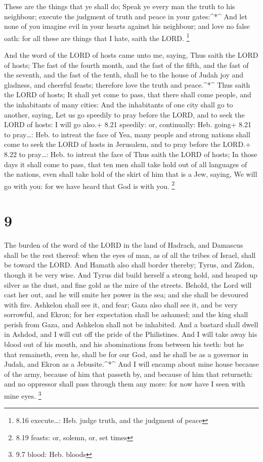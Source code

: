  These are the things that ye shall do; Speak ye every man
the truth to his neighbour; execute the judgment of truth and peace in
your gates:\^{}*\^{}  And let none of you imagine evil in
your hearts against his neighbour; and love no false oath: for all these
are things that I hate, saith the LORD. \footnote{8.16 execute\ldots:
  Heb. judge truth, and the judgment of peace}

 And the word of the LORD of hosts came unto me, saying,
 Thus saith the LORD of hosts; The fast of the fourth
month, and the fast of the fifth, and the fast of the seventh, and the
fast of the tenth, shall be to the house of Judah joy and gladness, and
cheerful feasts; therefore love the truth and peace.\^{}*\^{}
 Thus saith the LORD of hosts; It shall yet come to pass,
that there shall come people, and the inhabitants of many cities:
 And the inhabitants of one city shall go to another,
saying, Let us go speedily to pray before the LORD, and to seek the LORD
of hosts: I will go also.+ 8.21 speedily: or, continually: Heb. going+
8.21 to pray\ldots: Heb. to intreat the face of  Yea, many
people and strong nations shall come to seek the LORD of hosts in
Jerusalem, and to pray before the LORD.+ 8.22 to pray\ldots: Heb. to
intreat the face of  Thus saith the LORD of hosts; In those
days it shall come to pass, that ten men shall take hold out of all
languages of the nations, even shall take hold of the skirt of him that
is a Jew, saying, We will go with you: for we have heard that God is
with you. \footnote{8.19 feasts: or, solemn, or, set times}

\hypertarget{section-8}{%
\section{9}\label{section-8}}

 The burden of the word of the LORD in the land of Hadrach,
and Damascus shall be the rest thereof: when the eyes of man, as of all
the tribes of Israel, shall be toward the LORD.  And Hamath
also shall border thereby; Tyrus, and Zidon, though it be very wise.
 And Tyrus did build herself a strong hold, and heaped up
silver as the dust, and fine gold as the mire of the streets.
 Behold, the Lord will cast her out, and he will smite her
power in the sea; and she shall be devoured with fire. 
Ashkelon shall see it, and fear; Gaza also shall see it, and be very
sorrowful, and Ekron; for her expectation shall be ashamed; and the king
shall perish from Gaza, and Ashkelon shall not be inhabited.
 And a bastard shall dwell in Ashdod, and I will cut off the
pride of the Philistines.  And I will take away his blood
out of his mouth, and his abominations from between his teeth: but he
that remaineth, even he, shall be for our God, and he shall be as a
governor in Judah, and Ekron as a Jebusite.\^{}*\^{}  And I
will encamp about mine house because of the army, because of him that
passeth by, and because of him that returneth: and no oppressor shall
pass through them any more: for now have I seen with mine eyes.
\footnote{9.7 blood: Heb. bloods}

